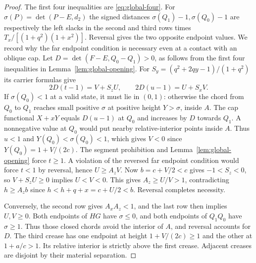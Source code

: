 \begin{proof}
The first four inequalities are \eqref{eq:global-four}. For $\sigma(P)=\det(P-E,d_2)$ the signed distances $\sigma(Q_1)-1,\sigma(Q_0)-1$ are respectively the left slacks in the second and third rows times $T_x/[(1+q^2)(1+x^2)]$. Reversal gives the two opposite endpoint values. We record why the far endpoint condition is necessary even at a contact with an oblique cap. Let $D=\det(F-E,Q_0-Q_1)>0$, as follows from the first four inequalities in Lemma~\ref{lem:global-opening}. For $S_y=(q^2+2qy-1)/(1+q^2)$ its carrier formulas give
\[
 2D(t-1)=V+S_zU,\qquad 2D(u-1)=U+S_xV .
\]
If $\sigma(Q_0)<1$ at a valid state, it must lie in $(0,1)$: otherwise the chord from $Q_0$ to $Q_1$ reaches small positive $\sigma$ at positive height $Y>\sigma$, inside $A$. The cap functional $X+xY$ equals $D(u-1)$ at $Q_0$ and increases by $D$ towards $Q_1$. A nonnegative value at $Q_0$ would put nearby relative-interior points inside $A$. Thus $u<1$ and $Y(Q_0)<\sigma(Q_0)<1$, which gives $V<0$ since $Y(Q_0)=1+V/(2c)$. The segment prohibition and Lemma~\ref{lem:global-opening} force $t\ge1$. A violation of the reversed far endpoint condition would force $t<1$ by reversal, hence $U\ge A_zV$. Now $b=c+V/2<c$ gives $-1<S_z<0$, so $V+S_zU\ge0$ implies $U<V<0$. This gives $A_z\ge U/V>1$, contradicting $h\ge A_zb$ since $h<h+q+x=c+U/2<b$. Reversal completes necessity.

Conversely, the second row gives $A_xA_z<1$, and the last row then implies $U,V\ge0$. Both endpoints of $HG$ have $\sigma\le0$, and both endpoints of $Q_1Q_0$ have $\sigma\ge1$. Thus those closed chords avoid the interior of $A$, and reversal accounts for $D$. The third crease has one endpoint at height $1+V/(2c)\ge1$ and the other at $1+a/c>1$. Its relative interior is strictly above the first crease. Adjacent creases are disjoint by their material separation.


\end{proof}
